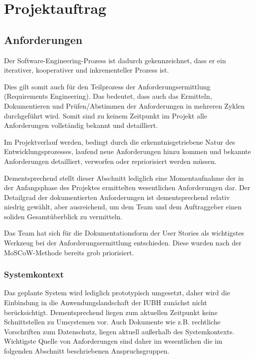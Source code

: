 \documentclass[a4paper,11pt,listof=numbered,glossary=totoc,parskip=half,toc=bib]{scrreprt}
\begin{document}
	\chapter{Projektauftrag}

	\section{Anforderungen}

Der Software-Engineering-Prozess ist dadurch gekennzeichnet, dass er ein iterativer, kooperativer und inkrementeller Prozess ist.

Dies gilt somit auch für den Teilprozess der Anforderungsermittlung (Requirements Engineering).
Das bedeutet, dass auch das Ermitteln, Dokumentieren und Prüfen/Abstimmen der Anforderungen in mehreren Zyklen durchgeführt wird. Somit sind zu keinem Zeitpunkt im Projekt alle Anforderungen vollständig bekannt und detailliert.

Im Projektverlauf werden, bedingt durch die erkenntnisgetriebene Natur des Entwicklungsprozesses, laufend neue Anforderungen hinzu kommen und bekannte Anforderungen detailliert, verworfen oder repriorisiert werden müssen. 

Dementsprechend stellt dieser Abschnitt lediglich eine Momentaufnahme der in der Anfangsphase des Projektes ermittelten wesentlichen Anforderungen dar. Der Detailgrad der dokumentierten Anforderungen ist dementsprechend relativ niedrig gewählt, aber ausreichend, um dem Team und dem Auftraggeber einen soliden Gesamtüberblick zu vermitteln.

Das Team hat sich für die Dokumentationsform der User Stories als wichtigstes Werkzeug bei der Anforderungsermittlung entschieden. Diese wurden nach der MoSCoW-Methode bereits grob priorisiert.

\subsection{Systemkontext}

Das geplante System wird lediglich prototypisch umgesetzt, daher wird die Einbindung in die Anwendungslandschaft der IUBH zunächst nicht berücksichtigt.
Dementsprechend liegen zum aktuellen Zeitpunkt keine Schnittstellen zu Umsystemen vor.
Auch Dokumente wie z.B. rechtliche Vorschriften zum Datenschutz, liegen aktuell außerhalb des Systemkontexts.
Wichtigste Quelle von Anforderungen sind daher im wesentlichen die im folgenden Abschnitt beschriebenen Anspruchsgruppen.
\end{document}
